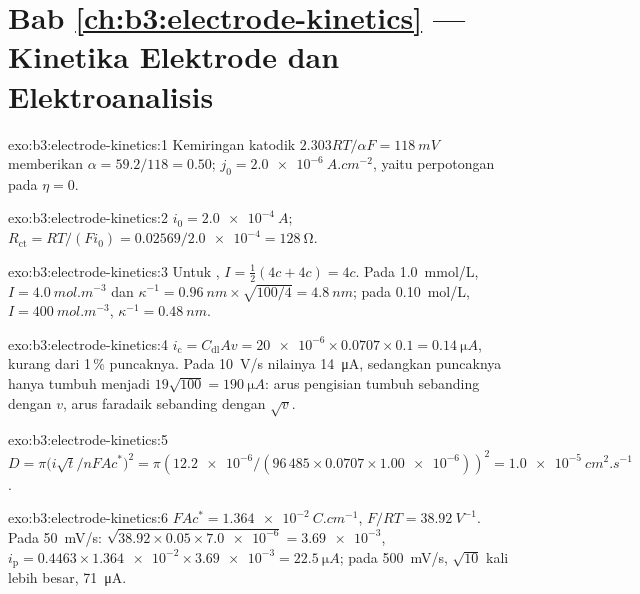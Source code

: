 \section*{Bab \ref{ch:b3:electrode-kinetics} --- Kinetika Elektrode dan Elektroanalisis}

\begin{solution}{exo:b3:electrode-kinetics:1}
Kemiringan katodik $2.303RT/\alpha F = \qty{118}{mV}$ memberikan $\alpha = 59.2/118 = 0.50$;
$j_0 = \qty{2.0e-6}{A.cm^{-2}}$, yaitu perpotongan pada $\eta = 0$.
\end{solution}

\begin{solution}{exo:b3:electrode-kinetics:2}
$i_0 = \qty{2.0e-4}{A}$; $R_{\mathrm{ct}} = RT/(Fi_0) = 0.02569/\num{2.0e-4} = \qty{128}{\ohm}$.
\end{solution}

\begin{solution}{exo:b3:electrode-kinetics:3}
Untuk , $I = \frac12(4c + 4c) = 4c$. Pada \qty{1.0}{mmol/L}, $I = \qty{4.0}{mol.m^{-3}}$
dan $\kappa^{-1} =
\qty{0.96}{nm} \times \sqrt{100/4} = \qty{4.8}{nm}$; pada \qty{0.10}{mol/L}, $I = \qty{400}{mol.m^{-3}}$,
$\kappa^{-1} = \qty{0.48}{nm}$.
\end{solution}

\begin{solution}{exo:b3:electrode-kinetics:4}
$i_{\mathrm c} = C_{\mathrm{dl}}Av = \num{20e-6} \times 0.0707 \times 0.1 = \qty{0.14}{\micro A}$, kurang dari
1\,\% puncaknya. Pada \qty{10}{V/s} nilainya \qty{14}{\micro A}, sedangkan
puncaknya hanya tumbuh menjadi $19\sqrt{100} = \qty{190}{\micro A}$: arus
pengisian tumbuh sebanding dengan $v$, arus faradaik sebanding dengan $\sqrt v$.
\end{solution}

\begin{solution}{exo:b3:electrode-kinetics:5}
$D = \pi\bigl(i\sqrt t/nFAc^*\bigr)^2 = \pi(\num{12.2e-6}/(96\,485 \times 0.0707 \times \num{1.00e-6}))^2 =
\qty{1.0e-5}{cm^2.s^{-1}}$.
\end{solution}

\begin{solution}{exo:b3:electrode-kinetics:6}
$FAc^* = \qty{1.364e-2}{C.cm^{-1}}$, $F/RT = \qty{38.92}{V^{-1}}$. Pada \qty{50}{mV/s}:
$\sqrt{38.92 \times 0.05 \times \num{7.0e-6}} =
\num{3.69e-3}$, $i_{\mathrm p} = 0.4463 \times \num{1.364e-2} \times \num{3.69e-3} = \qty{22.5}{\micro A}$;
pada \qty{500}{mV/s}, $\sqrt{10}$ kali lebih besar, \qty{71}{\micro A}.
\end{solution}

